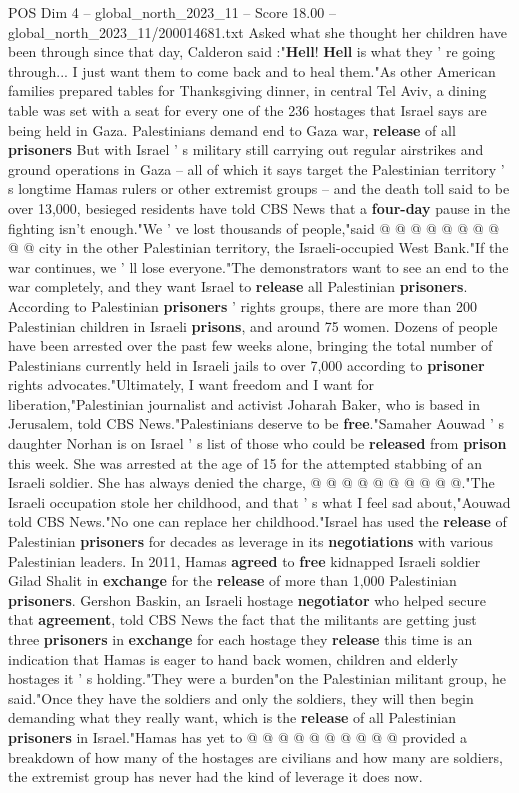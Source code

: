\begin{textsample}{POS Dim 4 – global\_north\_2023\_11 – Score 18.00 – global\_north\_2023\_11/200014681.txt}
Asked what she thought her children have been through since that day, Calderon said :"\textbf{Hell}! \textbf{Hell} is what they ' re going through...
I just want them to come back and to heal them."As other American families prepared tables for Thanksgiving dinner, in central Tel Aviv, a dining table was set with a seat for every one of the 236 hostages that Israel says are being held in Gaza.
Palestinians demand end to Gaza war, \textbf{release} of all \textbf{prisoners} But with Israel ' s military still carrying out regular airstrikes and ground operations in Gaza -- all of which it says target the Palestinian territory ' s longtime Hamas rulers or other extremist groups -- and the death toll said to be over 13,000, besieged residents have told CBS News that a \textbf{four-day} pause in the fighting isn't enough."We ' ve lost thousands of people,"said @ @ @ @ @ @ @ @ @ @ city in the other Palestinian territory, the Israeli-occupied West Bank."If the war continues, we ' ll lose everyone."The demonstrators want to see an end to the war completely, and they want Israel to \textbf{release} all Palestinian \textbf{prisoners}.
According to Palestinian \textbf{prisoners} ' rights groups, there are more than 200 Palestinian children in Israeli \textbf{prisons}, and around 75 women.
Dozens of people have been arrested over the past few weeks alone, bringing the total number of Palestinians currently held in Israeli jails to over 7,000 according to \textbf{prisoner} rights advocates."Ultimately, I want freedom and I want for liberation,"Palestinian journalist and activist Joharah Baker, who is based in Jerusalem, told CBS News."Palestinians deserve to be \textbf{free}."Samaher Aouwad ' s daughter Norhan is on Israel ' s list of those who could be \textbf{released} from \textbf{prison} this week.
She was arrested at the age of 15 for the attempted stabbing of an Israeli soldier.
She has always denied the charge, @ @ @ @ @ @ @ @ @ @."The Israeli occupation stole her childhood, and that ' s what I feel sad about,"Aouwad told CBS News."No one can replace her childhood."Israel has used the \textbf{release} of Palestinian \textbf{prisoners} for decades as leverage in its \textbf{negotiations} with various Palestinian leaders.
In 2011, Hamas \textbf{agreed} to \textbf{free} kidnapped Israeli soldier Gilad Shalit in \textbf{exchange} for the \textbf{release} of more than 1,000 Palestinian \textbf{prisoners}.
Gershon Baskin, an Israeli hostage \textbf{negotiator} who helped secure that \textbf{agreement}, told CBS News the fact that the militants are getting just three \textbf{prisoners} in \textbf{exchange} for each hostage they \textbf{release} this time is an indication that Hamas is eager to hand back women, children and elderly hostages it ' s holding."They were a burden"on the Palestinian militant group, he said."Once they have the soldiers and only the soldiers, they will then begin demanding what they really want, which is the \textbf{release} of all Palestinian \textbf{prisoners} in Israel."Hamas has yet to @ @ @ @ @ @ @ @ @ @ provided a breakdown of how many of the hostages are civilians and how many are soldiers, the extremist group has never had the kind of leverage it does now.

\end{textsample}

